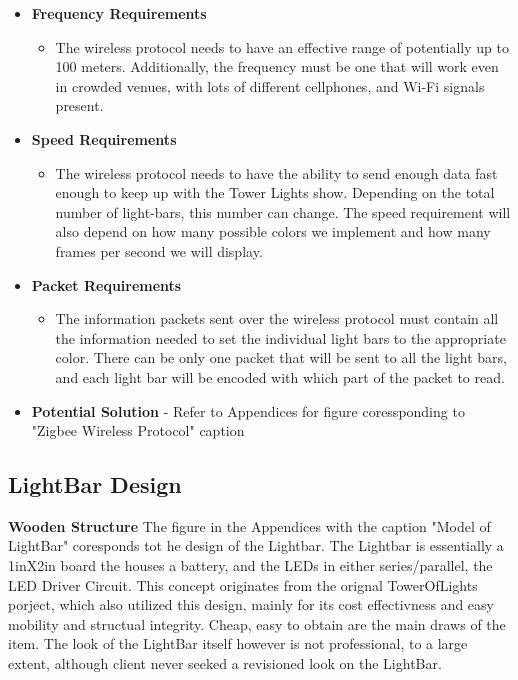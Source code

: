 \documentclass[12pt]{article}
\begin{document}
{{					%
					{\renewcommand\labelitemi{}
						\begin{itemize}
							\item \textbf{Frequency Requirements}
							\begin{itemize}
								\item The wireless protocol needs to have an effective range of potentially up to 100 meters. Additionally, the
								frequency must be one that will work even in crowded venues, with lots of different cellphones, and
								Wi-Fi signals present.
							\end{itemize}
							\item \textbf{Speed Requirements}
							\begin{itemize}
								\item The wireless protocol needs to have the ability to send enough data fast enough to keep up with the
								Tower Lights show. Depending on the total number of light-bars, this number can change. The speed
								requirement will also depend on how many possible colors we implement and how many frames per
								second we will display.
							\end{itemize}
							\item \textbf{Packet Requirements}
							\begin{itemize}
								\item The information packets sent over the wireless protocol must contain all the information needed to set
								the individual light bars to the appropriate color. There can be only one packet that will be sent to all
								the light bars, and each light bar will be encoded with which part of the packet to read.
							\end{itemize}
							\item \textbf{Potential Solution} - Refer to Appendices for figure coressponding to "Zigbee Wireless Protocol" caption
						\end{itemize}
		
			\subsection{LightBar Design}
			
			\textbf{Wooden Structure}
			The figure in the Appendices with the caption "Model of LightBar" coresponds tot he design of the Lightbar. The Lightbar is essentially a 1inX2in board the houses a battery, and the LEDs in either series/parallel, the LED Driver Circuit. This concept originates from the orignal TowerOfLights porject, which also utilized this design, mainly for its cost effectivness and easy mobility and structual integrity. Cheap, easy to obtain are the main draws of the item. The look of the LightBar itself however is not professional, to a large extent, although client never seeked a revisioned look on the LightBar.
			
}}}
\end{document}
